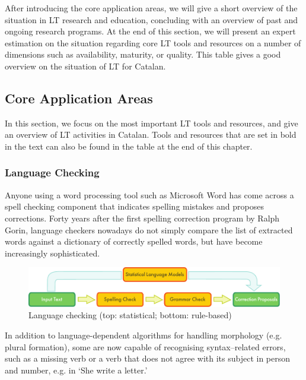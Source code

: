 \begin{multicols}{2}
After introducing the core application areas, we will give a short overview of the situation in LT research and education, concluding with an overview of past and ongoing research programs. At the end of this section, we will present an expert estimation on the situation regarding core LT tools and resources on a number of dimensions such as availability, maturity, or quality. This table gives a good overview on the situation of LT for Catalan.

\subsection{Core Application Areas}

    In this section, we focus on the most important LT tools and resources, and give an overview of LT activities in Catalan. Tools and resources that are set in bold in the text can also be found in the table at the end of this chapter.

\subsubsection{Language Checking}

Anyone using a word processing tool such as Microsoft Word has come across a spell checking component that indicates spelling mistakes and proposes corrections. Forty years after the first spelling correction program by Ralph Gorin, language checkers nowadays do not simply compare the list of extracted words against a dictionary of correctly spelled words, but have become increasingly sophisticated. 

\begin{figure}[htb]
  \center
  \includegraphics[width=\textwidth]{../_media/english/language_checking}
  \caption{Language checking (top: statistical; bottom: rule-based)}
  \label{fig:langcheckingaarch_en}
\end{figure}

In addition to language-dependent algorithms for handling morphology (e.g. plural formation), some are now capable of recognising syntax–related errors, such as a missing verb or a verb that does not agree with its subject in person and number, e.g. in ‘She write a letter.’ 


\end{multicols}
